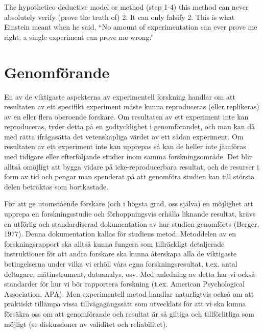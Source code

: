 \documentclass[
]{book}
\begin{document}
The hypothetico-deductive model or method (step 1-4) this method can never absolutely verify (prove the truth of) 2. It can only falsify 2. This is what Einstein meant when he said, ``No amount of experimentation can ever prove me right; a single experiment can prove me wrong.'' \citep{einstein2002induction}

\hypertarget{chap07}{%
\chapter{Genomförande}\label{chap07}}

En av de viktigaste aspekterna av experimentell forskning handlar om att resultaten av ett specifikt experiment måste kunna reproduceras (eller replikeras) av en eller flera oberoende forskare. Om resultaten av ett experiment inte kan reproduceras, tyder detta på en godtycklighet i genomförandet, och man kan då med rätta ifrågasätta det vetenskapliga värdet av ett sådan experiment. Om resultaten av ett experiment inte kan upprepas så kan de heller inte jämföras med tidigare eller efterföljande studier inom samma forskningsområde. Det blir alltså omöjligt att bygga vidare på icke-reproducerbara resultat, och de resurser i form av tid och pengar man spenderat på att genomföra studien kan till största delen betraktas som bortkastade.

För att ge utomstående forskare (och i högsta grad, oss själva) en möjlighet att upprepa en forskningsstudie och förhoppningsvis erhålla liknande resultat, krävs en utförlig och standardiserad dokumentation av hur studien genomförts (Berger, 1977). Denna dokumentation kallas för studiens metod. Metoddelen av en forskningsrapport ska alltså kunna fungera som tillräckligt detaljerade instruktioner för att andra forskare ska kunna återskapa alla de viktigaste betingelserna under vilka vi erhöll våra egna forskningsresultat, t.ex. antal deltagare, mätinstrument, dataanalys, osv. Med anledning av detta har vi också standarder för hur vi bör rapportera forskning (t.ex. American Psychological Association, APA). Men experimentell metod handlar naturligtvis också om att praktiskt tillämpa vissa tillvägagångssätt som utvecklats för att vi ska kunna försäkra oss om att genomförande och resultat är så giltiga och tillförlitliga som möjligt (se diskussioner av validitet och reliabilitet).
\end{document}
